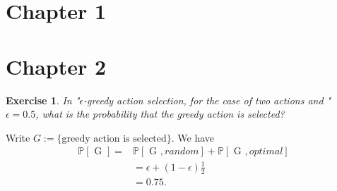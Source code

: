 \documentclass[answers]{exam}
\newtheorem{exercise}[theorem]{Exercise}
\theoremstyle{definition}
\theoremstyle{remark}
\newcommand{\Proba}[1]{\mathbb{P}\left[#1\right]}
\begin{document}
\section{Chapter 1}

\section{Chapter 2}


\begin{exercise}
In "$\epsilon$-greedy action selection, for the case of two actions and " $\epsilon= 0.5$, what is
the probability that the greedy action is selected?
\end{exercise}
\begin{solution}
Write $G:=\{\text{greedy action is selected}\}$. We have
\begin{align*}
\Proba{\text{ G }}=&\Proba{\text{ G },random}+\Proba{\text{ G },optimal}    \\
&=\epsilon+(1-\epsilon)\frac{1}{2}\\
&=0.75.
\end{align*}  
\end{solution}
\end{document}
